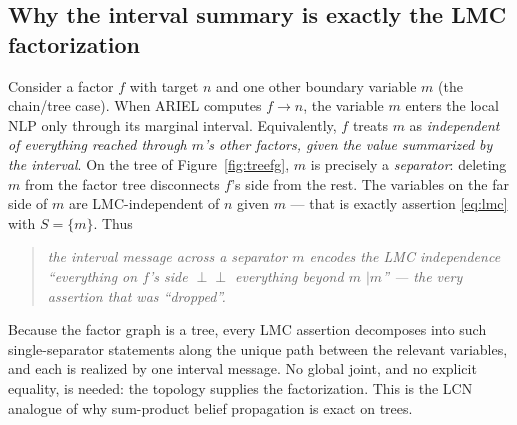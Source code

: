 \documentclass[11pt]{article}
\newcommand{\indep}{\perp\!\!\!\perp}
\begin{document}
\subsection{Why the interval summary is exactly the LMC factorization}
Consider a factor $f$ with target $n$ and one other boundary variable $m$ (the chain/tree case).
When ARIEL computes $f\!\to\!n$, the variable $m$ enters the local NLP only through its marginal
interval. Equivalently, $f$ treats $m$ as \emph{independent of everything reached through $m$'s
other factors, given the value summarized by the interval}. On the tree of
Figure~\ref{fig:treefg}, $m$ is precisely a \emph{separator}: deleting $m$ from the factor tree
disconnects $f$'s side from the rest. The variables on the far side of $m$ are LMC-independent of
$n$ given $m$ --- that is exactly assertion \eqref{eq:lmc} with $S=\{m\}$. Thus
\begin{quote}\emph{the interval message across a separator $m$ encodes the LMC independence
``everything on $f$'s side $\indep$ everything beyond $m$ $\mid m$'' --- the very assertion that was
``dropped''.} \end{quote}
Because the factor graph is a tree, every LMC assertion decomposes into such single-separator
statements along the unique path between the relevant variables, and each is realized by one
interval message. No global joint, and no explicit equality, is needed: the topology supplies the
factorization. This is the LCN analogue of why sum-product belief propagation is exact on trees.
\end{document}
